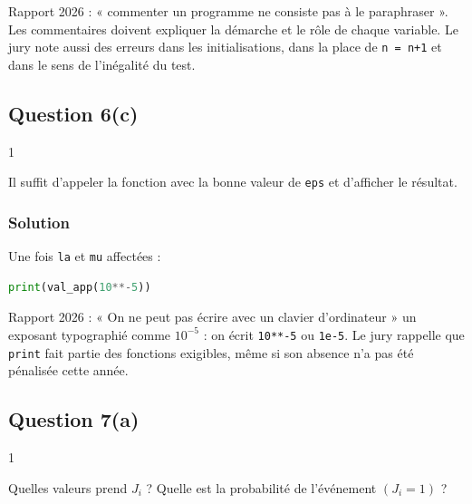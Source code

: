 \documentclass[11pt,a4paper]{article}
\begin{document}
\begin{jury}

Rapport 2026 : « commenter un programme ne consiste pas à le paraphraser ». Les commentaires doivent expliquer la démarche et le rôle de chaque variable. Le jury note aussi des erreurs dans les initialisations, dans la place de \texttt{n\ =\ n+1} et dans le sens de l'inégalité du test.

\end{jury}

\hypertarget{question-6c}{%
\subsection{Question 6(c)}\label{question-6c}}

\begin{indication}{1}

Il suffit d'appeler la fonction avec la bonne valeur de \texttt{eps} et d'afficher le résultat.

\end{indication}

\hypertarget{solution-29}{%
\subsubsection{Solution}\label{solution-29}}

Une fois \texttt{la} et \texttt{mu} affectées :

\begin{lstlisting}[language=Python]
print(val_app(10**-5))
\end{lstlisting}

\begin{jury}

Rapport 2026 : « On ne peut pas écrire avec un clavier d'ordinateur » un exposant typographié comme \(10^{-5}\) : on écrit \texttt{10**-5} ou \texttt{1e-5}. Le jury rappelle que \texttt{print} fait partie des fonctions exigibles, même si son absence n'a pas été pénalisée cette année.

\end{jury}

\hypertarget{question-7a-1}{%
\subsection{Question 7(a)}\label{question-7a-1}}

\begin{indication}{1}

Quelles valeurs prend \(J_i\) ? Quelle est la probabilité de l'événement \((J_i=1)\) ?

\end{indication}
\end{document}
